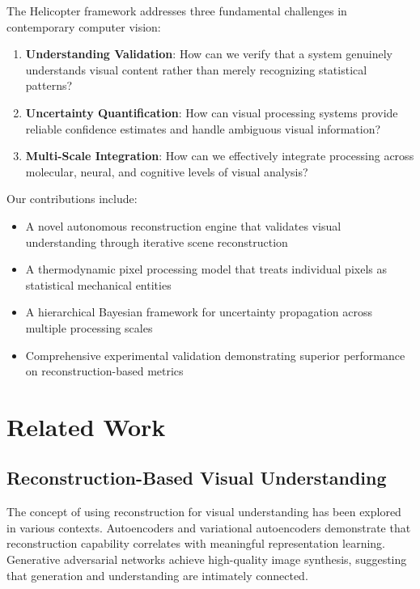 \documentclass[12pt,a4paper]{article}
\begin{document}
The Helicopter framework addresses three fundamental challenges in contemporary computer vision:

\begin{enumerate}
\item \textbf{Understanding Validation}: How can we verify that a system genuinely understands visual content rather than merely recognizing statistical patterns?
\item \textbf{Uncertainty Quantification}: How can visual processing systems provide reliable confidence estimates and handle ambiguous visual information?
\item \textbf{Multi-Scale Integration}: How can we effectively integrate processing across molecular, neural, and cognitive levels of visual analysis?
\end{enumerate}

Our contributions include:

\begin{itemize}
\item A novel autonomous reconstruction engine that validates visual understanding through iterative scene reconstruction
\item A thermodynamic pixel processing model that treats individual pixels as statistical mechanical entities
\item A hierarchical Bayesian framework for uncertainty propagation across multiple processing scales
\item Comprehensive experimental validation demonstrating superior performance on reconstruction-based metrics
\end{itemize}

\section{Related Work}

\subsection{Reconstruction-Based Visual Understanding}

The concept of using reconstruction for visual understanding has been explored in various contexts. Autoencoders \cite{hinton2006reducing} and variational autoencoders \cite{kingma2013auto} demonstrate that reconstruction capability correlates with meaningful representation learning. Generative adversarial networks \cite{goodfellow2014generative} achieve high-quality image synthesis, suggesting that generation and understanding are intimately connected.
\end{document}
